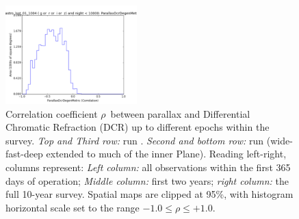 \begin{figure}[ht]
\begin{center}
  \includegraphics[width=2.0in]{./figs/milkyway/astromPanels/MW_Astrom_paDcrDegen_wfdPlane_10y_hst.png}
  \end{center}
  \caption{Correlation coefficient $\rho$~between parallax and Differential Chromatic Refraction (DCR) up to different epochs within the survey. {\it Top and Third row:} \OpSim run . {\it Second and bottom row:} \OpSim run  (wide-fast-deep extended to much of the inner Plane). Reading left-right, columns represent: {\it Left column:} all observations within the first 365 days of operation; {\it Middle column:} first two years; {\it right column:} the full 10-year survey. Spatial maps are clipped at 95\%, with histogram horizontal scale set to the range $-1.0 \le \rho \le +1.0$.}
  \label{fig_astrom_ByTime_PADegen}
\end{figure}



